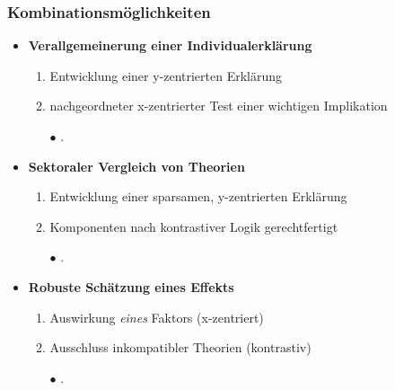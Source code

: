 \documentclass{beamer}
\begin{document}
\begin{frame}
\frametitle{Kombinationsmöglichkeiten}
\begin{itemize}
  \item \textbf{Verallgemeinerung einer Individualerklärung}
  \begin{enumerate}
    \item Entwicklung einer y-zentrierten Erklärung
    \item nachgeordneter x-zentrierter Test einer wichtigen Implikation
    \item [$\bullet$] \scriptsize{}.
  \end{enumerate}
  \item \textbf{Sektoraler Vergleich von Theorien}
  \begin{enumerate}
    \item Entwicklung einer sparsamen, y-zentrierten Erklärung
    \item Komponenten nach kontrastiver Logik gerechtfertigt
    \item [$\bullet$] \scriptsize{}.
  \end{enumerate}
  \item \textbf{Robuste Schätzung eines Effekts}
  \begin{enumerate}
    \item Auswirkung \textit{eines} Faktors (x-zentriert)
    \item Ausschluss inkompatibler Theorien (kontrastiv)
    \item [$\bullet$] \scriptsize{}.
  \end{enumerate}
\end{itemize}
\end{frame}
\end{document}
